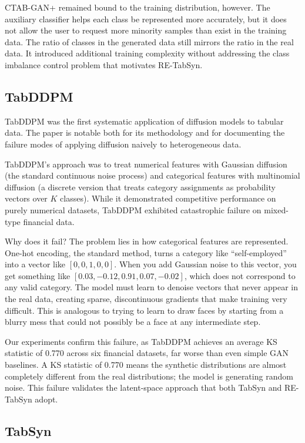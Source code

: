 CTAB-GAN+ remained bound to the training distribution, however. The auxiliary classifier helps each class be represented more accurately, but it does not allow the user to request more minority samples than exist in the training data. The ratio of classes in the generated data still mirrors the ratio in the real data. It introduced additional training complexity without addressing the class imbalance control problem that motivates RE-TabSyn.

\subsection{TabDDPM}

TabDDPM \cite{kotelnikov2023tabddpm} was the first systematic application of diffusion models to tabular data. The paper is notable both for its methodology and for documenting the failure modes of applying diffusion naively to heterogeneous data.

TabDDPM's approach was to treat numerical features with Gaussian diffusion (the standard continuous noise process) and categorical features with multinomial diffusion (a discrete version that treats category assignments as probability vectors over $K$ classes). While it demonstrated competitive performance on purely numerical datasets, TabDDPM exhibited catastrophic failure on mixed-type financial data.

Why does it fail? The problem lies in how categorical features are represented. One-hot encoding, the standard method, turns a category like ``self-employed'' into a vector like $[0, 0, 1, 0, 0]$. When you add Gaussian noise to this vector, you get something like $[0.03, -0.12, 0.91, 0.07, -0.02]$, which does not correspond to any valid category. The model must learn to denoise vectors that never appear in the real data, creating sparse, discontinuous gradients that make training very difficult. This is analogous to trying to learn to draw faces by starting from a blurry mess that could not possibly be a face at any intermediate step.

Our experiments confirm this failure, as TabDDPM achieves an average KS statistic of 0.770 across six financial datasets, far worse than even simple GAN baselines. A KS statistic of 0.770 means the synthetic distributions are almost completely different from the real distributions; the model is generating random noise. This failure validates the latent-space approach that both TabSyn and RE-TabSyn adopt.

\subsection{TabSyn}


